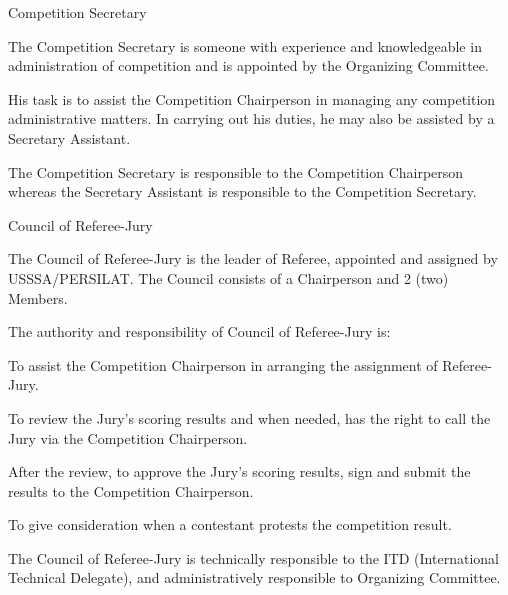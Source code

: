 \begin{legal}
\item Competition Secretary
    \begin{legal}
    \item The Competition Secretary is someone with experience and knowledgeable in
administration of competition and is appointed by the Organizing Committee.
    \item His task is to assist the Competition Chairperson in managing any competition
administrative matters. In carrying out his duties, he may also be assisted by a
Secretary Assistant.
    \item The Competition Secretary is responsible to the Competition Chairperson whereas
the Secretary Assistant is responsible to the Competition Secretary.
    \end{legal}

\item Council of Referee-Jury
    \begin{legal}
    \item The Council of Referee-Jury is the leader of Referee, appointed and assigned by
        USSSA/PERSILAT. The Council consists of a Chairperson and 2 (two) Members.

    \item The authority and responsibility of Council of Referee-Jury is:
        \begin{legal}
        \item To assist the Competition Chairperson in arranging the assignment of Referee-Jury.
        \item To review the Jury’s scoring results and when needed, has the right to call the Jury via the Competition Chairperson.
        \item After the review, to approve the Jury’s scoring results, sign and submit the results to the Competition Chairperson.
        \item To give consideration when a contestant protests the competition result.
        \item The Council of Referee-Jury is technically responsible to the ITD (International
Technical Delegate), and administratively responsible to Organizing Committee.
        \end{legal}
    \end{legal}


\end{legal}
